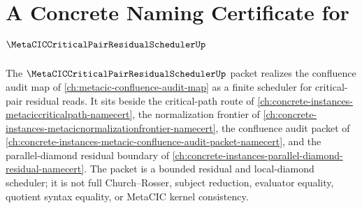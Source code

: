 \chapter{A Concrete Naming Certificate for $\MetaCICCriticalPairResidualSchedulerUp$}
\label{ch:concrete-instances-metacic-critical-pair-residual-scheduler-namecert}

The $\MetaCICCriticalPairResidualSchedulerUp$ packet realizes the confluence audit map of \autoref{ch:metacic-confluence-audit-map} as a finite scheduler for critical-pair residual reads. It sits beside the critical-path route of \autoref{ch:concrete-instances-metaciccriticalpath-namecert}, the normalization frontier of \autoref{ch:concrete-instances-metacicnormalizationfrontier-namecert}, the confluence audit packet of \autoref{ch:concrete-instances-metacic-confluence-audit-packet-namecert}, and the parallel-diamond residual boundary of \autoref{ch:concrete-instances-parallel-diamond-residual-namecert}. The packet is a bounded residual and local-diamond scheduler; it is not full Church--Rosser, subject reduction, evaluator equality, quotient syntax equality, or MetaCIC kernel consistency.

